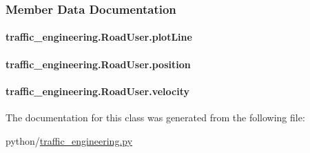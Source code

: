 \subsubsection{Member Data Documentation}
\hypertarget{classtraffic__engineering_1_1RoadUser_a288af60f7c5503d632fac5a6fe1ba95f}{
\paragraph[{plot\-Line}]{\setlength{\rightskip}{0pt plus 5cm}traffic\-\_\-engineering.\-Road\-User.\-plot\-Line}}\label{classtraffic__engineering_1_1RoadUser_a288af60f7c5503d632fac5a6fe1ba95f}
\hypertarget{classtraffic__engineering_1_1RoadUser_a92811b712640b70ead2464b7fffdd542}{
\paragraph[{position}]{\setlength{\rightskip}{0pt plus 5cm}traffic\-\_\-engineering.\-Road\-User.\-position}}\label{classtraffic__engineering_1_1RoadUser_a92811b712640b70ead2464b7fffdd542}
\hypertarget{classtraffic__engineering_1_1RoadUser_a7079a72070f9195666285a3f421fc971}{
\paragraph[{velocity}]{\setlength{\rightskip}{0pt plus 5cm}traffic\-\_\-engineering.\-Road\-User.\-velocity}}\label{classtraffic__engineering_1_1RoadUser_a7079a72070f9195666285a3f421fc971}


The documentation for this class was generated from the following file\-:\begin{DoxyCompactItemize}
\item 
python/\hyperlink{traffic__engineering_8py}{traffic\-\_\-engineering.\-py}\end{DoxyCompactItemize}
